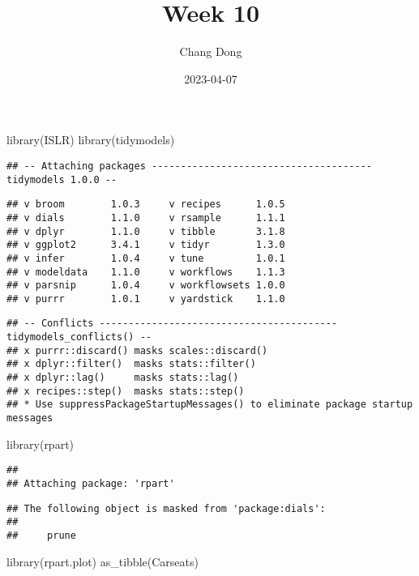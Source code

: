 \documentclass[
]{article}
\title{Week 10}
\author{Chang Dong}
\date{2023-04-07}
\newenvironment{Shaded}{\begin{snugshade}}{\end{snugshade}}
\newcommand{\FunctionTok}[1]{\textcolor[rgb]{0.00,0.00,0.00}{#1}}
\newcommand{\NormalTok}[1]{#1}
\begin{document}
\maketitle

\begin{Shaded}
\begin{Highlighting}[]
\FunctionTok{library}\NormalTok{(ISLR)}
\FunctionTok{library}\NormalTok{(tidymodels)}
\end{Highlighting}
\end{Shaded}

\begin{verbatim}
## -- Attaching packages -------------------------------------- tidymodels 1.0.0 --
\end{verbatim}

\begin{verbatim}
## v broom        1.0.3     v recipes      1.0.5
## v dials        1.1.0     v rsample      1.1.1
## v dplyr        1.1.0     v tibble       3.1.8
## v ggplot2      3.4.1     v tidyr        1.3.0
## v infer        1.0.4     v tune         1.0.1
## v modeldata    1.1.0     v workflows    1.1.3
## v parsnip      1.0.4     v workflowsets 1.0.0
## v purrr        1.0.1     v yardstick    1.1.0
\end{verbatim}

\begin{verbatim}
## -- Conflicts ----------------------------------------- tidymodels_conflicts() --
## x purrr::discard() masks scales::discard()
## x dplyr::filter()  masks stats::filter()
## x dplyr::lag()     masks stats::lag()
## x recipes::step()  masks stats::step()
## * Use suppressPackageStartupMessages() to eliminate package startup messages
\end{verbatim}

\begin{Shaded}
\begin{Highlighting}[]
\FunctionTok{library}\NormalTok{(rpart) }
\end{Highlighting}
\end{Shaded}

\begin{verbatim}
## 
## Attaching package: 'rpart'
\end{verbatim}

\begin{verbatim}
## The following object is masked from 'package:dials':
## 
##     prune
\end{verbatim}

\begin{Shaded}
\begin{Highlighting}[]
\FunctionTok{library}\NormalTok{(rpart.plot)}
\FunctionTok{as\_tibble}\NormalTok{(Carseats)}
\end{Highlighting}
\end{Shaded}
\end{document}
